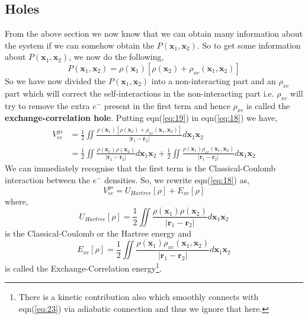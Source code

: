 \documentclass{article}
\begin{document}
 \subsection*{\Large{Holes}}
  \begin{Large}
   \begin{flushleft}
    From the above section we now know that we can obtain many information about the system if we can somehow obtain the $P(\textbf{x}_1,\textbf{x}_2)$. So to get some information about $P(\textbf{x}_1,\textbf{x}_2)$, we now do the following,
    \begin{equation}\label{eq:19}
    P(\textbf{x}_1,\textbf{x}_2) = \rho(\textbf{x}_1)[\rho(\textbf{x}_2)+\rho_{xc}(\textbf{x}_1,\textbf{x}_2)]
    \end{equation}
    So we have now divided the $P(\textbf{x}_1,\textbf{x}_2)$ into a non-interacting part and an $\rho_{xc}$ part which will correct the self-interactions in the non-interacting part i.e. $\rho_{xc}$ will try to remove the extra $e^-$ present in the first term and hence $\rho_{xc}$ is called the \textbf{exchange-correlation hole}. Putting eqn(\ref{eq:19}) in eqn(\ref{eq:18}) we have,
    \begin{equation}\label{eq:20}
    \begin{split}
    V_{ee}^{gs} &= \frac{1}{2}\displaystyle{\iint}\frac{\rho(\textbf{x}_1)[\rho(\textbf{x}_2)+\rho_{xc}(\textbf{x}_1,\textbf{x}_2)]}{|\textbf{r}_1-\textbf{r}_2|}d\textbf{x}_1\textbf{x}_2\\
    &= \frac{1}{2}\displaystyle{\iint}\frac{\rho(\textbf{x}_1)\rho(\textbf{x}_2)}{|\textbf{r}_1-\textbf{r}_2|}d\textbf{x}_1\textbf{x}_2 + \frac{1}{2}\displaystyle{\iint}\frac{\rho(\textbf{x}_1)\rho_{xc}(\textbf{x}_1,\textbf{x}_2)}{|\textbf{r}_1-\textbf{r}_2|}d\textbf{x}_1\textbf{x}_2
    \end{split}
    \end{equation}
    We can immediately recognise that the first term is the Classical-Coulomb interaction between the $e^-$ densities. So, we rewrite eqn(\ref{eq:18}) as,
    \begin{equation}\label{eq:21}
    V_{ee}^{gs} = U_{Hartree}[\rho] + E_{xc}[\rho]
    \end{equation} 
    where,
    \begin{equation}\label{eq:22}
    U_{Hartree}[\rho] = \frac{1}{2}\displaystyle{\iint}\frac{\rho(\textbf{x}_1)\rho(\textbf{x}_2)}{|\textbf{r}_1-\textbf{r}_2|}d\textbf{x}_1\textbf{x}_2
    \end{equation}
    is the Classical-Coulomb or the Hartree energy and
    \begin{equation}\label{eq:23}
    E_{xc}[\rho] = \frac{1}{2}\displaystyle{\iint}\frac{\rho(\textbf{x}_1)\rho_{xc}(\textbf{x}_1,\textbf{x}_2)}{|\textbf{r}_1-\textbf{r}_2|}d\textbf{x}_1\textbf{x}_2
	\end{equation}
	is called the Exchange-Correlation energy\footnote{There is a kinetic contribution also which smoothly connects with eqn(\ref{eq:23}) via adiabatic connection and thus we ignore that here.}.             
   \end{flushleft}
  \end{Large}
  
\end{document}
